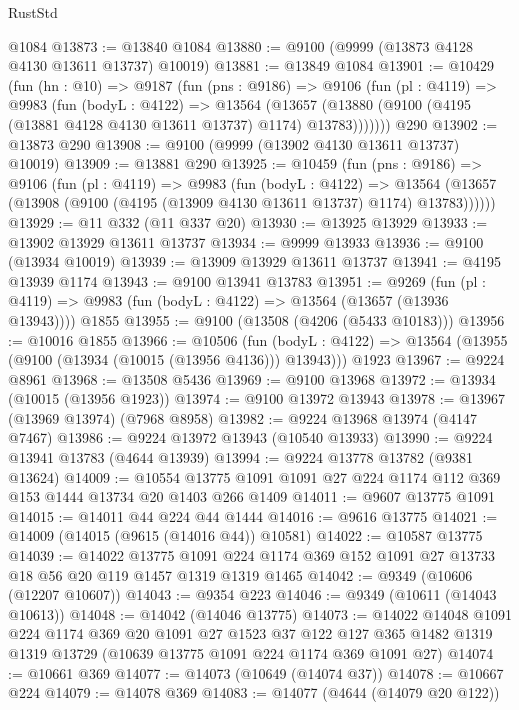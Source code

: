 \begin{lexlean}{RustStd}
\begin{coremodule}
    @1084
@13873 := @13840 @1084
@13880 := @9100 (@9999 (@13873 @4128 @4130 @13611 @13737) @10019)
@13881 := @13849 @1084
@13901 := @10429
    (fun (hn : @10) =>
    @9187
      (fun (pns : @9186) =>
      @9106
        (fun (pl : @4119) =>
        @9983
          (fun (bodyL : @4122) =>
          @13564
            (@13657 (@13880 (@9100 (@4195 (@13881 @4128 @4130 @13611 @13737) @1174) @13783)))))))
    @290
@13902 := @13873 @290
@13908 := @9100 (@9999 (@13902 @4130 @13611 @13737) @10019)
@13909 := @13881 @290
@13925 := @10459
    (fun (pns : @9186) =>
    @9106
      (fun (pl : @4119) =>
      @9983
        (fun (bodyL : @4122) =>
        @13564 (@13657 (@13908 (@9100 (@4195 (@13909 @4130 @13611 @13737) @1174) @13783))))))
@13929 := @11 @332 (@11 @337 @20)
@13930 := @13925 @13929
@13933 := @13902 @13929 @13611 @13737
@13934 := @9999 @13933
@13936 := @9100 (@13934 @10019)
@13939 := @13909 @13929 @13611 @13737
@13941 := @4195 @13939 @1174
@13943 := @9100 @13941 @13783
@13951 := @9269
    (fun (pl : @4119) => @9983 (fun (bodyL : @4122) => @13564 (@13657 (@13936 @13943))))
    @1855
@13955 := @9100 (@13508 (@4206 (@5433 @10183)))
@13956 := @10016 @1855
@13966 := @10506
    (fun (bodyL : @4122) => @13564 (@13955 (@9100 (@13934 (@10015 (@13956 @4136))) @13943)))
    @1923
@13967 := @9224 @8961
@13968 := @13508 @5436
@13969 := @9100 @13968
@13972 := @13934 (@10015 (@13956 @1923))
@13974 := @9100 @13972 @13943
@13978 := @13967 (@13969 @13974) (@7968 @8958)
@13982 := @9224 @13968 @13974 (@4147 @7467)
@13986 := @9224 @13972 @13943 (@10540 @13933)
@13990 := @9224 @13941 @13783 (@4644 @13939)
@13994 := @9224 @13778 @13782 (@9381 @13624)
@14009 := @10554 @13775 @1091 @1091 @27 @224 @1174 @112 @369 @153 @1444 @13734 @20 @1403 @266 @1409
@14011 := @9607 @13775 @1091
@14015 := @14011 @44 @224 @44 @1444
@14016 := @9616 @13775
@14021 := @14009 (@14015 (@9615 (@14016 @44)) @10581)
@14022 := @10587 @13775
@14039 := @14022
    @13775
    @1091
    @224
    @1174
    @369
    @152
    @1091
    @27
    @13733
    @18
    @56
    @20
    @119
    @1457
    @1319
    @1319
    @1465
@14042 := @9349 (@10606 (@12207 @10607))
@14043 := @9354 @223
@14046 := @9349 (@10611 (@14043 @10613))
@14048 := @14042 (@14046 @13775)
@14073 := @14022
    @14048
    @1091
    @224
    @1174
    @369
    @20
    @1091
    @27
    @1523
    @37
    @122
    @127
    @365
    @1482
    @1319
    @1319
    @13729
    (@10639 @13775 @1091 @224 @1174 @369 @1091 @27)
@14074 := @10661 @369
@14077 := @14073 (@10649 (@14074 @37))
@14078 := @10667 @224
@14079 := @14078 @369
@14083 := @14077 (@4644 (@14079 @20 @122))

\end{coremodule}
\end{lexlean}
